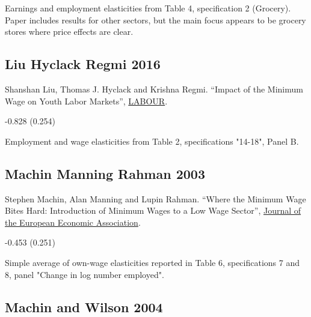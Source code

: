  Earnings and employment elasticities from Table 4, specification 2 (Grocery). Paper includes results for other sectors, but the main focus appears to be grocery stores where price effects are clear.

\subsection*{Liu Hyclack Regmi 2016}
\vspace{-0.7em}

\noindent Shanshan Liu, Thomas J. Hyclack and Krishna Regmi. ``Impact of the Minimum Wage on Youth Labor Markets'', \href{https://doi.org/10.1111/labr.12071}{LABOUR}.

\vspace{0.7em}

 -0.828 (0.254)

\vspace{0.7em}

 Employment and wage elasticities from Table 2, specifications "14-18", Panel B.

\subsection*{Machin Manning Rahman 2003}
\vspace{-0.7em}

\noindent Stephen Machin, Alan Manning and Lupin Rahman. ``Where the Minimum Wage Bites Hard: Introduction of Minimum Wages to a Low Wage Sector'', \href{https://doi.org/10.1162/154247603322256792}{Journal of the European Economic Association}.

\vspace{0.7em}

 -0.453 (0.251)

\vspace{0.7em}

 Simple average of own-wage elasticities reported in Table 6, specifications 7 and 8, panel "Change in log number employed".

\subsection*{Machin and Wilson 2004}
\vspace{-0.7em}

